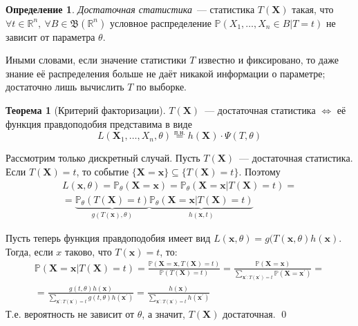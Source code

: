 \documentclass[oneside,final,14pt]{extreport}
\renewenvironment{proof}{{\bfseries Доказательство.}}{\qed}
\theoremstyle{plain}
\theoremstyle{definition}
\newtheorem*{defn}{Определение}
\theoremstyle{named}
\newtheorem*{namedthm}{Теорема}
\begin{document}
\begin{defn}
{\it Достаточная статистика}~--- статистика $T(\mathbf{X})$ такая, что $\forall t \in \mathbb{R}^{n},~ \forall B \in \mathfrak{B}(\mathbb{R}^{n})$ условное распределение $\mathbb{P}(X_1, \ldots, X_n \in B | T=t)$ не зависит от параметра $\theta$.
\end{defn}

Иными словами, если значение статистики $T$ известно и фиксировано, то даже знание её распределения больше не даёт никакой информации о параметре; достаточно лишь вычислить $T$ по выборке.

\begin{namedthm}[Критерий факторизации]
$T(\mathbf{X})$~--- достаточная статистика $\Leftrightarrow$ её функция правдоподобия представима в виде 
\begin{equation*}
    L(\mathbf{X}_{1}, \ldots, X_{n} , \theta) \stackrel{\text{п.н.}}{=} h(\mathbf{X}) \cdot \Psi(T, \theta)
\end{equation*}
\end{namedthm}

\begin{proof}
Рассмотрим только дискретный случай. Пусть $T(\mathbf{X})$~--- достаточная статистика. Если $T(\mathbf{X})=t$, то событие $\{\mathbf{X}=\mathbf{x}\} \subseteq \{T(\mathbf{X})=t\}$. Поэтому
\begin{multline*}
    L(\mathbf{x}, \theta) = \mathbb{P}_{\theta}(\mathbf{X}=\mathbf{x})=\mathbb{P}_{\theta}(\mathbf{X}=\mathbf{x} | T(\mathbf{X})=t) =\\
    = \underbrace{\mathbb{P}_{\theta}(T(\mathbf{X})=t)}_{g(T(\mathbf{x}), \theta)} \underbrace{\mathbb{P}_{\theta}(\mathbf{X}=\mathbf{x} | T(\mathbf{X})=t)}_{h(\mathbf{x}, t)}
\end{multline*}

Пусть теперь функция правдоподобия имеет вид $L(\mathbf{x}, \theta)=g(T(\mathbf{x}, \theta) h(\mathbf{x})$. Тогда, если $x$ таково, что $T(\mathbf{x})=t$, то:
\begin{multline*}
    \mathbb{P}(\mathbf{X}=\mathbf{x} | T(\mathbf{X})=t) =\frac{\mathbb{P}(\mathbf{X}=\mathbf{x}, T(\mathbf{X})=t)}{\mathbb{P}(T(\mathbf{X})=t)}
    =\frac{\mathbb{P}(\mathbf{X}=\mathbf{x})}{\sum\limits_{\mathbf{x}^{\prime}: T(\mathbf{x}^{\prime})=t} \mathbb{P}(\mathbf{X}=\mathbf{x}^{\prime})} = \\
    = \frac{g(t, \theta) h(\mathbf{x})}{\sum\limits_{\mathbf{x}^{\prime}: T(\mathbf{x}^{\prime})=t} g(t, \theta) h(\mathbf{x}^{\prime})}
    = \frac{h(\mathbf{x})}{\sum\limits_{\mathbf{x}^{\prime}: T(\mathbf{x}^{\prime})=t} h(\mathbf{x}^{\prime})}
\end{multline*}
Т.е. вероятность не зависит от $\theta$, а значит, $T(\mathbf{X})$ достаточная.
\end{proof}
\end{document}
